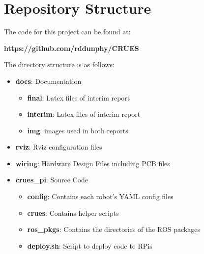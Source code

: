 
\chapter{Repository Structure}
\label{appendix/a}

The code for this project can be found at:
\begin{center}
\textbf{https://github.com/rddunphy/CRUES}
\end{center}

The directory structure is as follows:

\begin{itemize}
	\item \textbf{docs}: Documentation
		\begin{itemize}
			\item \textbf{final}: Latex files of interim report
			\item \textbf{interim}: Latex files of interim report
			\item \textbf{img}: images used in both reports
		\end{itemize}
	\item \textbf{rviz}: Rviz configuration files
	\item \textbf{wiring}: Hardware Design Files including PCB files
	\item \textbf{crues\_pi}: Source Code
		\begin{itemize}
			\item \textbf{config}: Contains each robot's YAML config files
			\item \textbf{crues}: Contains helper scripts
			\item \textbf{ros\_pkgs}: Contains the directories of the ROS packages
			\item \textbf{deploy.sh}: Script to deploy code to RPis
		\end{itemize}
\end{itemize}
